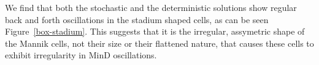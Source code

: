 \documentclass[letterpaper,twocolumn,amsmath,amssymb,pre]{revtex4-1}
\begin{document}
We find that both the stochastic and the deterministic solutions show
regular back and forth oscillations in the stadium shaped cells, as
can be seen Figure~\ref{box-stadium}.  This suggests that it is the
irregular, assymetric shape of the Mannik cells, not their size or
their flattened nature, that causes these cells to exhibit
irregularity in MinD oscillations.



\end{document}
